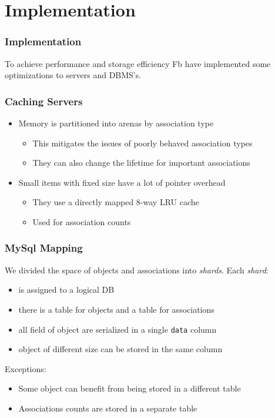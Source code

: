 \section{Implementation}
\begin{frame}
\frametitle{Implementation}
To achieve performance and storage efficiency Fb have implemented some optimizations to servers and DBMS's. 
\end{frame}

\begin{frame}[c]\frametitle{Caching Servers}
\begin{itemize}
	\item Memory is partitioned into arenas by association type
	\begin{itemize}
		\item This mitigates the issues of poorly behaved association types
		\item They can also change the lifetime for important associations
	\end{itemize}
	\item Small items with fixed size have a lot of pointer overhead
	\begin{itemize}
		\item They use a directly mapped 8-way LRU cache
		\item Used for association counts
	\end{itemize}
\end{itemize}    
\end{frame}

\begin{frame}[fragile]\frametitle{MySql Mapping}
    We divided the space of objects and associations into \emph{shards}. Each \emph{shard}:
    \begin{itemize}
    	\item is assigned to a logical DB
    	\item there is a table for objects and a table for associations
    	\item all field of object are serialized in a single \verb!data! column
    	\item object of different size can be stored in the same column
    \end{itemize}
Exceptions:
\begin{itemize}
	\item Some object can benefit from being stored in a different table
	\item Associations counts are stored in a separate table
\end{itemize}
\end{frame}